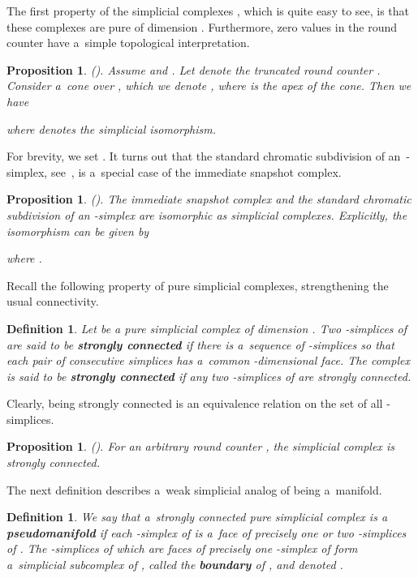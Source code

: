 \documentclass{amsart}[10pt]
\newtheorem{df}[theorem]{Definition}
\newtheorem{prop}[theorem]{Proposition}
\numberwithin{equation}{section}
\numberwithin{figure}{section}
\numberwithin{table}{section}
\begin{document}
The first property of the simplicial complexes , which is
quite easy to see, is that these complexes are pure of dimension
. Furthermore, zero values in the round counter have
a~simple topological interpretation.

\begin{prop}\label{prop:p4}{\rm (\cite[Proposition 4.4]{k1}).}
Assume  and . Let  denote the
truncated round counter . Consider a~cone over
, which we denote , where  is the apex
of the cone. Then we have
 
where  denotes the simplicial isomorphism.
\end{prop}

For brevity, we set . It turns
out that the standard chromatic subdivision of an~-simplex,
see~\cite{subd}, is a~special case of the immediate snapshot complex.

\begin{prop} {\rm (\cite[Proposition 4.10]{k1}).}
The immediate snapshot complex  and the standard chromatic
subdivision of an -simplex  are isomorphic as
simplicial complexes. Explicitly, the isomorphism can be given by

where .
\end{prop}

Recall the following property of pure simplicial complexes,
strengthening the usual connectivity.

\begin{df}
Let  be a pure simplicial complex of dimension . Two
-simplices of  are said to be {\bf strongly connected} if there
is a~sequence of -simplices so that each pair of consecutive
simplices has a~common -dimensional face. The complex  is
said to be {\bf strongly connected} if any two -simplices of 
are strongly connected.
\end{df}

Clearly, being strongly connected is an equivalence relation on the
set of all -simplices.

\begin{prop}\label{prop:strc} {\rm (\cite[Proposition 5.6]{k1}).}
For an arbitrary round counter , the simplicial complex 
is strongly connected.
\end{prop}

The next definition describes a~weak simplicial analog of being
a~manifold.

\begin{df}
We say that a~strongly connected pure simplicial complex  is a~{\bf
  pseudomanifold} if each -simplex of  is a~face of
precisely one or two -simplices of . The -simplices of
 which are faces of precisely one -simplex of  form
a~simplicial subcomplex of , called the {\bf boundary} of , and
denoted .
\end{df}
\end{document}
